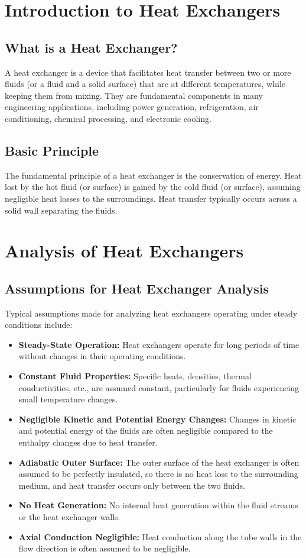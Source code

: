 \section{Introduction to Heat Exchangers}

\subsection{What is a Heat Exchanger?}
A heat exchanger is a device that facilitates heat transfer between two or more fluids (or a fluid and a solid surface) that are at different temperatures, while keeping them from mixing. They are fundamental components in many engineering applications, including power generation, refrigeration, air conditioning, chemical processing, and electronic cooling.

\subsection{Basic Principle}
The fundamental principle of a heat exchanger is the conservation of energy. Heat lost by the hot fluid (or surface) is gained by the cold fluid (or surface), assuming negligible heat losses to the surroundings. Heat transfer typically occurs across a solid wall separating the fluids.

\section{Analysis of Heat Exchangers}

\subsection{Assumptions for Heat Exchanger Analysis}
Typical assumptions made for analyzing heat exchangers operating under steady conditions include:
\begin{itemize}
    \item \textbf{Steady-State Operation:} Heat exchangers operate for long periods of time without changes in their operating conditions.
    \item \textbf{Constant Fluid Properties:} Specific heats, densities, thermal conductivities, etc., are assumed constant, particularly for fluids experiencing small temperature changes.
    \item \textbf{Negligible Kinetic and Potential Energy Changes:} Changes in kinetic and potential energy of the fluids are often negligible compared to the enthalpy changes due to heat transfer.
    \item \textbf{Adiabatic Outer Surface:} The outer surface of the heat exchanger is often assumed to be perfectly insulated, so there is no heat loss to the surrounding medium, and heat transfer occurs only between the two fluids.
    \item \textbf{No Heat Generation:} No internal heat generation within the fluid streams or the heat exchanger walls.
    \item \textbf{Axial Conduction Negligible:} Heat conduction along the tube walls in the flow direction is often assumed to be negligible.
\end{itemize}

